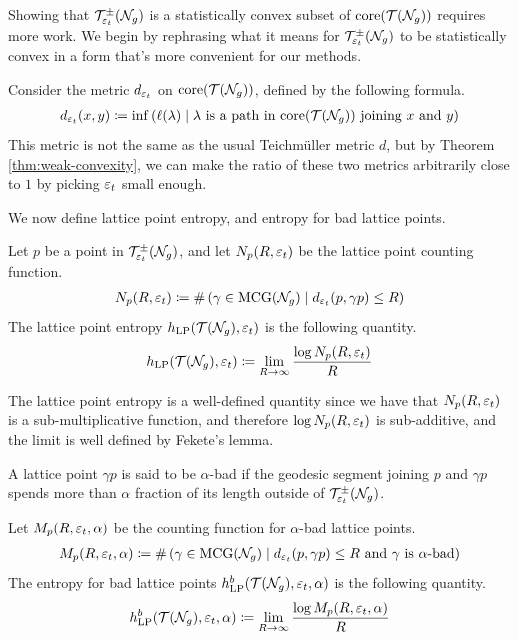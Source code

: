 \documentclass[12pt, reqno]{amsart}
\begin{document}
Showing that $\mathcal{T}_{\varepsilon_t}^{\pm}(\mathcal{N}_g)$ is a statistically convex subset of $\mathrm{core}(\mathcal{T}(\mathcal{N}_g))$ requires more work.
We begin by rephrasing what it means for $\mathcal{T}_{\varepsilon_t}^{\pm}(\mathcal{N}_g)$ to be statistically convex in a form that's more convenient for our methods.

Consider the metric $d_{\varepsilon_t}$ on $\mathrm{core}(\mathcal{T}(\mathcal{N}_g))$, defined by the following formula.
\begin{align*}
  d_{\varepsilon_t}(x, y) \coloneqq \inf\left( \ell(\lambda) \mid \text{$\lambda$ is a path in $\mathrm{core}(\mathcal{T}(\mathcal{N}_g))$ joining $x$ and $y$} \right)
\end{align*}
This metric is not the same as the usual Teichmüller metric $d$, but by Theorem \ref{thm:weak-convexity}, we can make the ratio of these two metrics arbitrarily close to $1$ by picking $\varepsilon_t$ small enough.

We now define lattice point entropy, and entropy for bad lattice points.
\begin{definition}
  Let $p$ be a point in $\mathcal{T}_{\varepsilon_t}^{\pm}(\mathcal{N}_g)$, and let $N_p(R, \varepsilon_t)$ be the lattice point counting function.
  \begin{align*}
    N_p(R, \varepsilon_t) \coloneqq \#\left( \gamma \in \mathrm{MCG}(\mathcal{N}_g) \mid d_{\varepsilon_t}(p, \gamma p) \leq R \right)
  \end{align*}
  The lattice point entropy $h_{\mathrm{LP}}(\mathcal{T}(\mathcal{N}_g), \varepsilon_t)$ is the following quantity.
  \begin{align*}
    h_{\mathrm{LP}}(\mathcal{T}(\mathcal{N}_g), \varepsilon_t) \coloneqq \lim_{R \to \infty} \frac{\log N_p(R, \varepsilon_t)}{R}
  \end{align*}
\end{definition}

\begin{rem}
  The lattice point entropy is a well-defined quantity since we have that $N_p(R, \varepsilon_t)$ is a sub-multiplicative function, and therefore $\log N_p(R, \varepsilon_t)$ is sub-additive, and the limit is well defined by Fekete's lemma.
\end{rem}

\begin{definition}
  A lattice point $\gamma p$ is said to be $\alpha$-bad if the geodesic segment joining $p$ and $\gamma p$ spends more than $\alpha$ fraction of its length outside of $\mathcal{T}_{\varepsilon_t}^{\pm}(\mathcal{N}_g)$.
\end{definition}

\begin{definition}
  Let $M_p(R, \varepsilon_t, \alpha)$ be the counting function for $\alpha$-bad lattice points.
  \begin{align*}
    M_p(R, \varepsilon_t, \alpha) \coloneqq \#\left( \gamma \in \mathrm{MCG}(\mathcal{N}_g) \mid \text{$d_{\varepsilon_t}(p, \gamma p) \leq R$ and $\gamma$ is $\alpha$-bad}  \right)
  \end{align*}
  The entropy for bad lattice points $h_{\mathrm{LP}}^b(\mathcal{T}(\mathcal{N}_g), \varepsilon_t, \alpha)$ is the following quantity.
  \begin{align*}
    h_{\mathrm{LP}}^b(\mathcal{T}(\mathcal{N}_g), \varepsilon_t, \alpha) \coloneqq \lim_{R \to \infty} \frac{\log M_p(R, \varepsilon_t, \alpha)}{R}
  \end{align*}
\end{definition}
\end{document}
